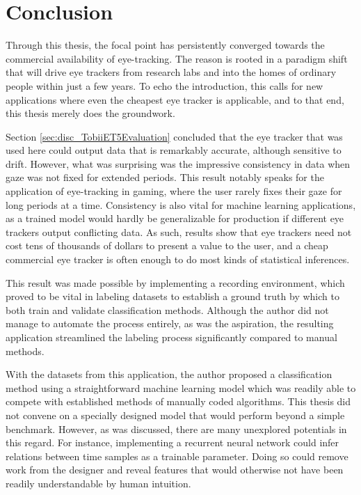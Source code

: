 \section{Conclusion}



Through this thesis, the focal point has persistently converged towards the commercial availability of eye-tracking. The reason is rooted in a paradigm shift that will drive eye trackers from research labs and into the homes of ordinary people within just a few years. To echo the introduction, this calls for new applications where even the cheapest eye tracker is applicable, and to that end, this thesis merely does the groundwork.

Section \ref{sec:disc_TobiiET5Evaluation} concluded that the eye tracker that was used here could output data that is remarkably accurate, although sensitive to drift. However, what was surprising was the impressive consistency in data when gaze was not fixed for extended periods. This result notably speaks for the application of eye-tracking in gaming, where the user rarely fixes their gaze for long periods at a time. Consistency is also vital for machine learning applications, as a trained model would hardly be generalizable for production if different eye trackers output conflicting data. As such, results show that eye trackers need not cost tens of thousands of dollars to present a value to the user, and a cheap commercial eye tracker is often enough to do most kinds of statistical inferences.

This result was made possible by implementing a recording environment, which proved to be vital in labeling datasets to establish a ground truth by which to both train and validate classification methods. Although the author did not manage to automate the process entirely, as was the aspiration, the resulting application streamlined the labeling process significantly compared to manual methods. 

With the datasets from this application, the author proposed a classification method using a straightforward machine learning model which was readily able to compete with established methods of manually coded algorithms. This thesis did not convene on a specially designed model that would perform beyond a simple benchmark. However, as was discussed, there are many unexplored potentials in this regard. For instance, implementing a recurrent neural network could infer relations between time samples as a trainable parameter. Doing so could remove work from the designer and reveal features that would otherwise not have been readily understandable by human intuition. 

